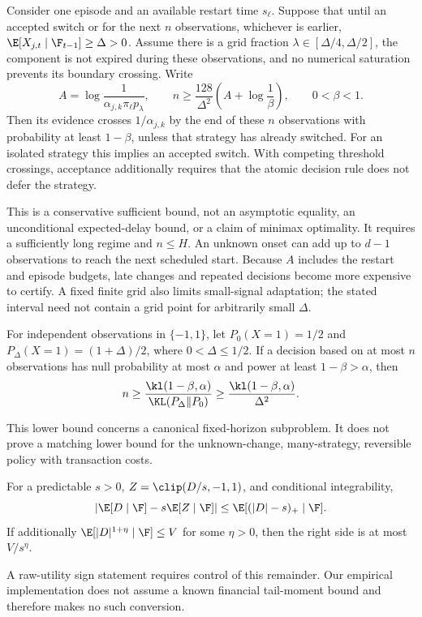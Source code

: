 \begin{theorem}\label{thm:delay}
Consider one episode and an available restart time $s_\ell$. Suppose that until an accepted switch or for the next $n$ observations, whichever is earlier,
$\E[X_{j,t}\mid\F_{t-1}]\ge\Delta>0$.
Assume there is a grid fraction $\lambda\in[\Delta/4,\Delta/2]$, the component is not expired during these observations, and no numerical saturation prevents its boundary crossing. Write
\begin{equation}
 A=\log\frac{1}{\alpha_{j,k}\pi_\ell p_\lambda},\qquad
 n\ge\frac{128}{\Delta^2}\left(A+\log\frac1\beta\right),\qquad 0<\beta<1.
\end{equation}
Then its evidence crosses $1/\alpha_{j,k}$ by the end of these $n$ observations with probability at least $1-\beta$, unless that strategy has already switched. For an isolated strategy this implies an accepted switch. With competing threshold crossings, acceptance additionally requires that the atomic decision rule does not defer the strategy.
\end{theorem}
This is a conservative sufficient bound, not an asymptotic equality, an unconditional expected-delay bound, or a claim of minimax optimality. It requires a sufficiently long regime and $n\le H$. An unknown onset can add up to $d-1$ observations to reach the next scheduled start. Because $A$ includes the restart and episode budgets, late changes and repeated decisions become more expensive to certify. A fixed finite grid also limits small-signal adaptation; the stated interval need not contain a grid point for arbitrarily small $\Delta$.

\begin{proposition}\label{prop:lower}
For independent observations in $\{-1,1\}$, let $P_0(X=1)=1/2$ and $P_\Delta(X=1)=(1+\Delta)/2$, where $0<\Delta\le1/2$. If a decision based on at most $n$ observations has null probability at most $\alpha$ and power at least $1-\beta>\alpha$, then
\begin{equation}
 n\ge\frac{\kl(1-\beta,\alpha)}{\KL(P_\Delta\Vert P_0)}
 \ge\frac{\kl(1-\beta,\alpha)}{\Delta^2}.
\end{equation}
\end{proposition}
This lower bound concerns a canonical fixed-horizon subproblem. It does not prove a matching lower bound for the unknown-change, many-strategy, reversible policy with transaction costs.

\begin{proposition}\label{prop:clip}
For a predictable $s>0$, $Z=\clip(D/s,-1,1)$, and conditional integrability,
\begin{equation}
 |\E[D\mid\F]-s\E[Z\mid\F]|
 \le\E[(|D|-s)_+\mid\F].
\end{equation}
If additionally $\E[|D|^{1+\eta}\mid\F]\le V$ for some $\eta>0$, then the right side is at most $V/s^\eta$.
\end{proposition}
A raw-utility sign statement requires control of this remainder. Our empirical implementation does not assume a known financial tail-moment bound and therefore makes no such conversion.

